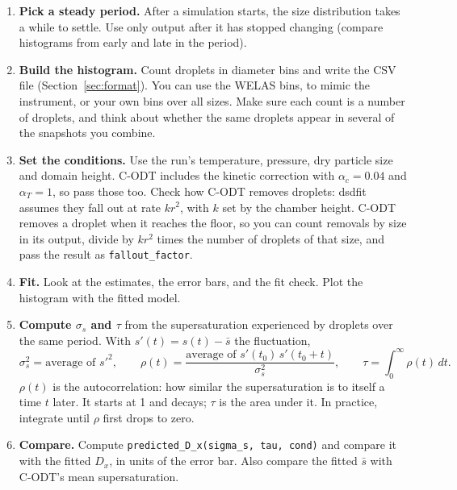 \documentclass[11pt]{article}
\newcommand{\sbar}{\bar s}
\newcommand{\Dx}{D_x}
\newcommand{\code}[1]{\texttt{#1}}
\begin{document}
\begin{enumerate}[itemsep=4pt]
\item \textbf{Pick a steady period.} After a simulation starts, the size distribution takes a while to
settle. Use only output after it has stopped changing (compare histograms from early and late in the
period).
\item \textbf{Build the histogram.} Count droplets in diameter bins and write the CSV file
(Section~\ref{sec:format}). You can use the WELAS bins, to mimic the instrument, or your own bins over all
sizes. Make sure each count is a number of droplets, and think about whether the same droplets appear in
several of the snapshots you combine.
\item \textbf{Set the conditions.} Use the run's temperature, pressure, dry particle size and domain
height. C-ODT includes the kinetic correction with $\alpha_c = 0.04$ and $\alpha_T = 1$, so pass those too.
Check how C-ODT removes droplets: dsdfit assumes they fall out at rate $k r^2$, with $k$ set by the
chamber height. C-ODT removes a droplet when it reaches the floor, so you can count removals by size in its
output, divide by $k r^2$ times the number of droplets of that size, and pass the result as
\code{fallout\_factor}.
\item \textbf{Fit.} Look at the estimates, the error bars, and the fit check. Plot the histogram with the
fitted model.
\item \textbf{Compute $\sigma_s$ and $\tau$} from the supersaturation experienced by droplets over the same
period. With $s'(t) = s(t) - \sbar$ the fluctuation,
\begin{equation*}
\sigma_s^2 = \text{average of } s'^2,
\qquad
\rho(t) = \frac{\text{average of } s'(t_0)\,s'(t_0 + t)}{\sigma_s^2},
\qquad
\tau = \int_0^{\infty} \rho(t)\,dt .
\end{equation*}
$\rho(t)$ is the autocorrelation: how similar the supersaturation is to itself a time $t$ later. It
starts at 1 and decays; $\tau$ is the area under it. In practice, integrate until $\rho$ first drops to
zero.
\item \textbf{Compare.} Compute \code{predicted\_D\_x(sigma\_s, tau, cond)} and compare it with the fitted
$\Dx$, in units of the error bar. Also compare the fitted $\sbar$ with C-ODT's mean supersaturation.
\end{enumerate}
\end{document}
